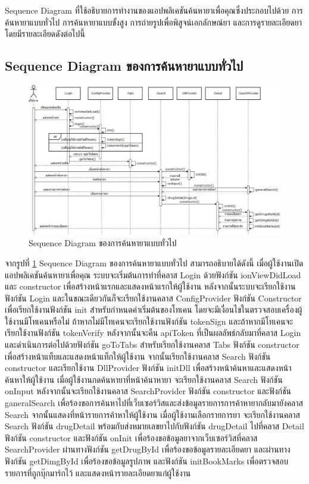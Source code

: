 	Sequence Diagram ที่ใช้อธิบายการทำงานของแอปพลิเคชันค้นหายาเพื่อคุณซึ่งประกอบไปด้วย 
	การค้นหายาแบบทั่วไป การค้นหายาแบบขั้งสูง การถ่ายรูปเพื่อพิสูจน์เอกลักษณ์ยา และการดูรายละเอียดยา 
	โดยมีรายละเอียดดังต่อไปนี้
	\subsection{Sequence Diagram ของการค้นหายาแบบทั่วไป}

	\begin{figure}[H]
		\includegraphics[width=\columnwidth]
		{Figures/3/Sequence-1}
		\caption{Sequence Diagram ของการค้นหายาแบบทั่วไป}
		\label{Fig:Sequence-1}
	\end{figure}

	จากรูปที่ \ref{Fig:Sequence-1} Sequence Diagram ของการค้นหายาแบบทั่วไป 
	สามารถอธิบายได้ดังนี้ 
	เมื่อผู้ใช้งานเปิดแอปพลิเคชันค้นหายาเพื่อคุณ 
	ระบบจะเริ่มต้นการทำที่คลาส Login ด้วยฟังก์ชัน ionViewDidLoad และ constructor 
	เพื่อสร้างหน้าแรกและแสดงหน้าแรกให้ผู้ใช้งาน 
	หลังจากนั้นระบบจะเรียกใช้งานฟังก์ชัน Login 
	และในขณะเดียวกันก็จะเรียกใช้งานคลาส ConfigProvider ฟังก์ชัน Constructor 
	เพื่อเรียกใช้งานฟังก์ชัน init สำหรับกำหนดค่าเริ่มต้นของโทเคน 
	โดยจะมีเงื่อนไขในตรวจสอบเครื่องผู้ใช้งานมีโทเคนหรือไม่ 
	ถ้าหากไม่มีโทเคนจะเรียกใช้งานฟังก์ชัน tokenSign 
	และถ้าหากมีโทเคนจะเรียกใช้งานฟังก์ชัน tokenVerify 
	หลังจากนั้นจะคืน apiToken ที่เป็นผลลัพธ์กลับมาที่คลาส Login 
	และดำเนินการต่อไปด้วยฟังก์ชัน goToTabs 
	สำหรับเรียกใช้งานคลาส Tabs ฟังก์ชัน constructor 
	เพื่อสร้างหน้าแท็บและแสดงหน้าแท็กให้ผู้ใช้งาน 
	จากนั้นเรียกใช้งานคลาส Search ฟังก์ชัน constructor 
	และเรียกใช้งาน DllProvider ฟังก์ชัน initDll 
	เพื่อสร้างหน้าค้นหาและแสดงหน้าค้นหาให้ผู้ใช้งาน 
	เมื่อผู้ใช้งานกดค้นหายาที่หน้าค้นาหายา จะเรียกใช้งานคลาส Search ฟังก์ชัน onInput 
	หลังจากนั้นจะเรียกใช้งานคลาส SearchProvider ฟังก์ชัน constructor 
	และฟังก์ชัน ganeralSearch เพื่อร้องขอการค้นหาไปที่เว็บเซอร์วิสและส่งข้อมูลรายการการค้าหายากลับมายังคลาส Search 
	จากนั้นแสดงที่หน้ารายการค้าหาให้ผู้ใช้งาน 
	เมื่อผู้ใช้งานเลือกรายการยา จะเรียกใช้งานคลาส Search ฟังก์ชัน drugDetail 
	พร้อมกับส่งหมายเลขยาไปกับฟังก์ชัน drugDetail ไปที่คลาส Detail ฟังก์ชัน constructor 
	และฟังก์ชัน onInit เพื่อร้องขอข้อมูลยาจากเว็บเซอร์วิสที่คลาส SearchProvider ผ่านทางฟังก์ชัน getDrugById เพื่อร้องขอข้อมูลรายละเอียดยา และผ่านทางฟังก์ชัน getDimgById 
	เพื่อร้องขอข้อมูลรูปภาพ และฟังก์ชัน initBookMarks เพื่อตรวจสอบรายการที่ถูกบุ๊กมาร์กไว้ 
	และแสดงหน้ารายละเอียดยาแก่ผู้ใช้งาน
	
